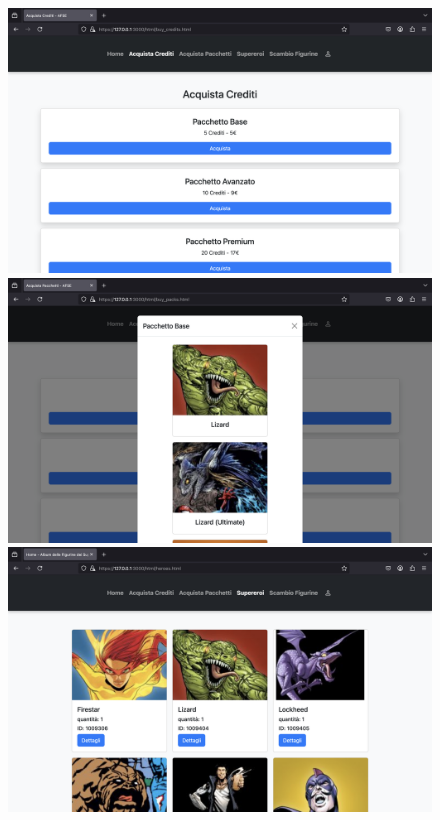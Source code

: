 \documentclass{article}
\begin{document}
\begin{figure}[H]
        \begin{minipage}{0.3\linewidth}
            \centering
            \includegraphics[width=\linewidth]{./content/crediti.png}
        \end{minipage}
        \hfill
        \begin{minipage}{0.3\linewidth}
            \centering
            \includegraphics[width=\linewidth]{./content/pacchetto.png}
        \end{minipage}
        \hfill
        \begin{minipage}{0.3\linewidth}
            \centering
            \includegraphics[width=\linewidth]{./content/album.png}
        \end{minipage}


\end{figure}
\end{document}

